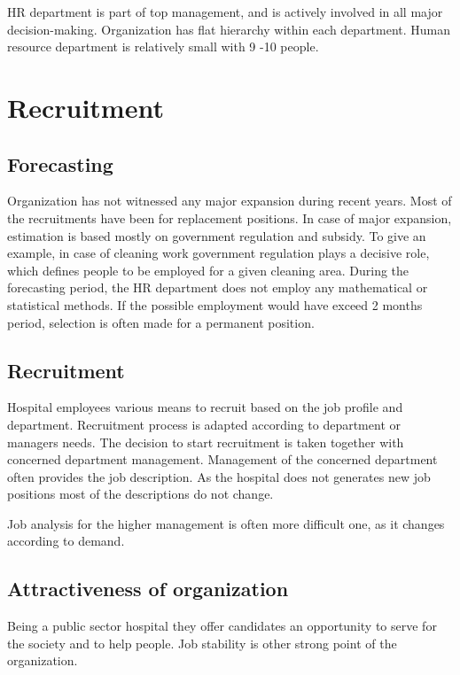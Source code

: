 \documentclass[a4paper,fleqn,11pt,dvips,titlepage]{article}
\numberwithin{figure}{section}
\numberwithin{equation}{section}
\begin{document}
HR department is part of top management, and is actively involved in all major decision-making.
Organization has flat hierarchy within each department.
Human resource department is relatively small with 9 -10 people.  

\section{Recruitment}

\subsection{Forecasting}

Organization has not witnessed any major expansion during recent years.
Most of the recruitments have been for replacement positions.
In case of major expansion, estimation is based mostly on government regulation and subsidy.
To give an example, in case of cleaning work government regulation plays a decisive role, which defines people to be employed for a given cleaning area.
During the forecasting period, the HR department does not employ any mathematical or statistical methods.
If the possible employment would have exceed 2 months period, selection is often made for a permanent position. 

\subsection{Recruitment}

Hospital employees various means to recruit based on the job profile and department.
Recruitment process is adapted according to department or managers needs.
The decision to start recruitment is taken together with concerned department management.
Management of the concerned department often provides the job description.
As the hospital does not generates new job positions most of the descriptions do not change. 

Job analysis for the higher management is often more difficult one, as it changes according to demand.

\subsection{Attractiveness of organization}

Being a public sector hospital they offer candidates an opportunity to serve for the society and to help people.
Job stability is other strong point of the organization. 
\end{document}
